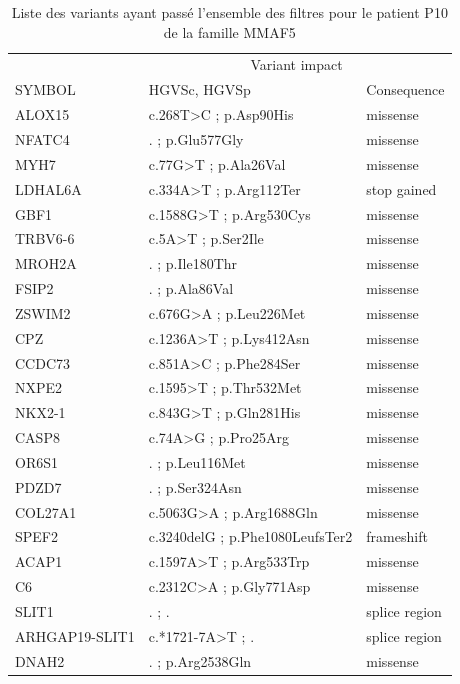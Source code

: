 \documentclass[12pt,twoside]{reedthesis}
\theoremstyle{definition}
\theoremstyle{definition}
\theoremstyle{remark}
\begin{document}
  \newpage
  
  \begin{longtable}[t]{lll}
  \caption{\label{tab:tabmmaf5}Liste des variants ayant passé l'ensemble des filtres pour le patient P10 de la famille MMAF5}\\
  \toprule
  \multicolumn{1}{c}{ } & \multicolumn{2}{c}{Variant impact} \\
  \cmidrule(l{2pt}r{2pt}){2-3}
  SYMBOL & HGVSc, HGVSp & Consequence\\
  \midrule
  ALOX15 & c.268T>C ; p.Asp90His & missense\\
  NFATC4 & . ; p.Glu577Gly & missense\\
  MYH7 & c.77G>T ; p.Ala26Val & missense\\
  LDHAL6A & c.334A>T ; p.Arg112Ter & stop gained\\
  GBF1 & c.1588G>T ; p.Arg530Cys & missense\\
  \addlinespace
  TRBV6-6 & c.5A>T ; p.Ser2Ile & missense\\
  MROH2A & . ; p.Ile180Thr & missense\\
  FSIP2 & . ; p.Ala86Val & missense\\
  ZSWIM2 & c.676G>A ; p.Leu226Met & missense\\
  CPZ & c.1236A>T ; p.Lys412Asn & missense\\
  \addlinespace
  CCDC73 & c.851A>C ; p.Phe284Ser & missense\\
  NXPE2 & c.1595>T ; p.Thr532Met & missense\\
  NKX2-1 & c.843G>T ; p.Gln281His & missense\\
  CASP8 & c.74A>G ; p.Pro25Arg & missense\\
  OR6S1 & . ; p.Leu116Met & missense\\
  \addlinespace
  PDZD7 & . ; p.Ser324Asn & missense\\
  COL27A1 & c.5063G>A ; p.Arg1688Gln & missense\\
  SPEF2 & c.3240delG ; p.Phe1080LeufsTer2 & frameshift\\
  ACAP1 & c.1597A>T ; p.Arg533Trp & missense\\
  C6 & c.2312C>A ; p.Gly771Asp & missense\\
  \addlinespace
  SLIT1 & . ; . & splice region\\
  ARHGAP19-SLIT1 & c.*1721-7A>T ; . & splice region\\
  DNAH2 & . ; p.Arg2538Gln & missense\\
  \bottomrule
  \end{longtable}
  
\end{document}
